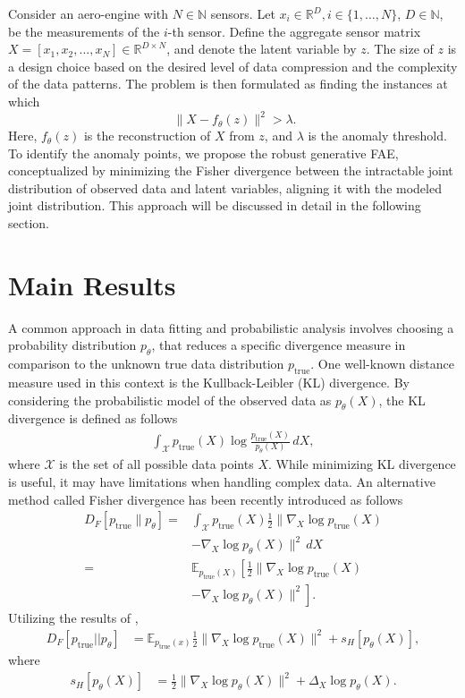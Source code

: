\documentclass[journal]{IEEEtran}
\begin{document}
Consider an aero-engine with \( N \in \mathbb{N} \) sensors. Let \( x_i \in \mathbb{R}^D, i \in \{1, \ldots, N\}\),  $D \in \mathbb{N}$,  be the measurements of the \( i \)-th sensor. Define the aggregate sensor matrix $X = [{x_1}, x_2, \ldots, x_N] \in \mathbb{R}^{D \times N}$, and denote the latent variable by $z$. The size of $z$ is a design choice based on the desired level of data compression and the complexity of the data patterns. The problem is then formulated as finding the instances at which
\begin{equation}
\ \|X - f_\theta(z)\|^2 >\lambda.
\end{equation}
Here, $f_\theta(z)$ is the reconstruction of $X$ from $z$, and $\lambda$ is the anomaly threshold. To identify the anomaly points, we propose the robust generative FAE, conceptualized by minimizing the Fisher divergence between the intractable joint distribution of observed data and latent variables, aligning it with the modeled joint distribution. This approach will be discussed in detail in the following section.
\section{Main Results}
A common approach in data fitting and probabilistic analysis involves choosing a probability distribution $p_{\theta}$, that reduces a specific divergence measure in comparison to the unknown true data distribution $p_{\text{true}}$. One well-known distance measure used in this context is the Kullback-Leibler (KL) divergence. By considering the probabilistic model of the observed data as $p_\theta(X)$, the KL divergence is defined as follows
\begin{align*}
\int_{\mathcal{X}} p_{\text{true}}(X) \log\frac{p_{\text{true}}(X)}{p_{\theta}(X)} \, dX,
\end{align*}
where $\mathcal{X}$ is the set of all possible data points $X$. While minimizing KL divergence is useful, it may have limitations when handling complex data. An alternative method called Fisher divergence has been recently introduced as follows \cite{Fisher}
\begin{align}
D_{F}[p_{\text{true}}\|p_{\theta}] = &\int_{\mathcal{X}} p_{\text{true}}(X) \frac{1}{2} \|\nabla_X \log p_{\text{true}}(X) \nonumber \\
&- \nabla_X \log p_{\theta}(X)\|^2 \, dX \nonumber \\
= &\mathbb{E}_{p_{\text{true}}(X)}\left[\frac{1}{2} \|\nabla_X \log p_{\text{true}}(X) \right. \nonumber \\
&\left. - \nabla_X \log p_{\theta}(X)\|^2\right].
\end{align}
Utilizing the results of \cite{Fisher},
\begin{align}\label{Ha}
D_{F} [p_{\text{true}}||p_{\theta}] &= \mathbb{E}_{p_{\text{true}}(x)} \frac{1}{2} \|\nabla_X \log p_{\text{true}}(X)\|^2  + s_{H} [p_{\theta}(X)],
\end{align}
where
\begin{align*}
s_{H} [p_{\theta}(X)] &= \frac{1}{2} \|\nabla_X \log p_{\theta}(X)\|^2 + \Delta_X \log p_{\theta}(X).
\end{align*}
\end{document}
